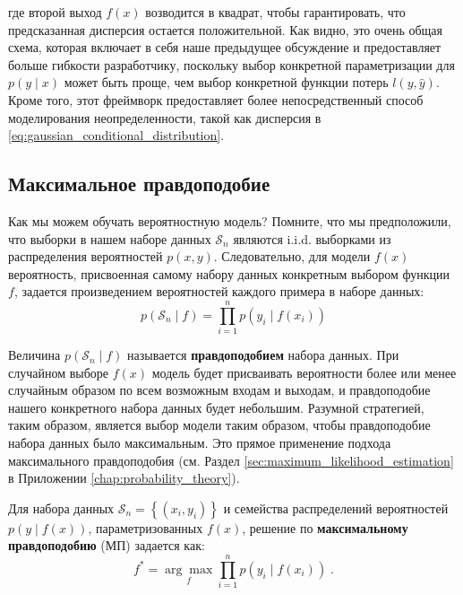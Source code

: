 \vspace{1em}
где второй выход $f(x)$ возводится в квадрат, чтобы гарантировать, что предсказанная дисперсия остается положительной. Как видно, это очень общая схема, которая включает в себя наше предыдущее обсуждение и предоставляет больше гибкости разработчику, поскольку выбор конкретной параметризации для $p(y \;\vert\; x)$ может быть проще, чем выбор конкретной функции потерь $l(y, \hat{y})$. Кроме того, этот фреймворк предоставляет более непосредственный способ моделирования неопределенности, такой как дисперсия в \eqref{eq:gaussian_conditional_distribution}.
%
\subsection{Максимальное правдоподобие}
%
Как мы можем обучать вероятностную модель? Помните, что мы предположили, что выборки в нашем наборе данных $\mathcal{S}_n$ являются i.i.d. выборками из распределения вероятностей $p(x,y)$. Следовательно, для модели $f(x)$ вероятность, присвоенная самому набору данных конкретным выбором функции $f$, задается произведением вероятностей каждого примера в наборе данных:
%
$$
p(\mathcal{S}_n \;\vert\; f)=\prod_{i=1}^n p(y_i \;\vert\; f(x_i))
$$

Величина $p(\mathcal{S}_n \;\vert\; f)$ называется \textbf{правдоподобием} набора данных. При случайном выборе $f(x)$ модель будет присваивать вероятности более или менее случайным образом по всем возможным входам и выходам, и правдоподобие нашего конкретного набора данных будет небольшим. Разумной стратегией, таким образом, является выбор модели таким образом, чтобы правдоподобие набора данных было максимальным. Это прямое применение подхода максимального правдоподобия (см. Раздел \ref{sec:maximum_likelihood_estimation} в Приложении \ref{chap:probability_theory}).

\begin{definition} \addbottle
Для набора данных $\mathcal{S}_n = \left\{(x_i, y_i)\right\}$ и семейства распределений вероятностей $p(y \;\vert\; f(x))$, параметризованных $f(x)$, решение по \textbf{максимальному правдоподобию} (МП) задается как:
%
$$
f^* = \underset{f}{\arg\max}\prod_{i=1}^n p(y_i \;\vert\; f(x_i)) \;.
$$
\end{definition}

